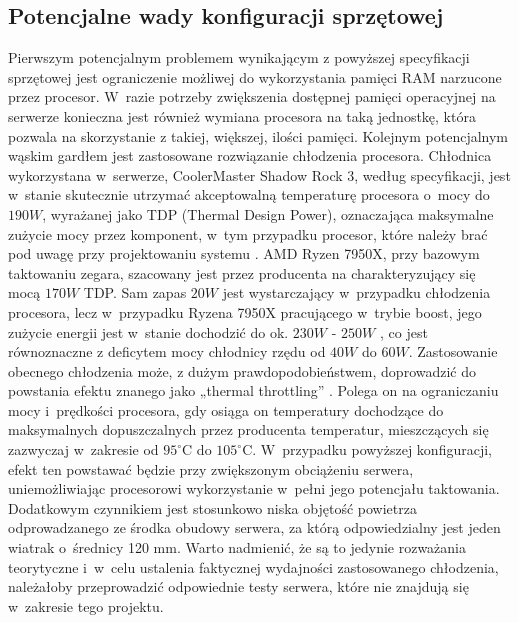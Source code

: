 \subsection{Potencjalne wady konfiguracji sprzętowej}
Pierwszym potencjalnym problemem wynikającym z powyższej specyfikacji sprzętowej jest ograniczenie możliwej do wykorzystania pamięci RAM narzucone przez procesor. W~razie potrzeby zwiększenia dostępnej pamięci operacyjnej na serwerze konieczna jest również wymiana procesora na taką jednostkę, która pozwala na skorzystanie z takiej, większej, ilości pamięci. Kolejnym potencjalnym wąskim gardłem jest zastosowane rozwiązanie chłodzenia procesora. Chłodnica wykorzystana w~serwerze, CoolerMaster Shadow Rock 3, według specyfikacji, jest w~stanie skutecznie utrzymać akceptowalną temperaturę procesora o~mocy do $190 W$, wyrażanej jako TDP (Thermal Design Power), oznaczająca maksymalne zużycie mocy przez komponent, w~tym przypadku procesor, które należy brać pod uwagę przy projektowaniu systemu \cite{intelTdp}. AMD Ryzen 7950X, przy bazowym taktowaniu zegara, szacowany jest przez producenta na charakteryzujący się mocą $170 W$ TDP. Sam zapas $20W$ jest wystarczający w~przypadku chłodzenia procesora, lecz w~przypadku Ryzena 7950X pracującego w~trybie boost, jego zużycie energii jest w~stanie dochodzić do ok. $230 W$ - $250 W$ \cite{amdPpt, testyMocy}, co jest równoznaczne z deficytem mocy chłodnicy rzędu od $40W$ do $60W$. Zastosowanie obecnego chłodzenia może, z dużym prawdopodobieństwem, doprowadzić do powstania efektu znanego jako „thermal throttling” \cite{throttling}. Polega on na ograniczaniu mocy i~prędkości procesora, gdy osiąga on temperatury dochodzące do maksymalnych dopuszczalnych przez producenta temperatur, mieszczących się zazwyczaj w~zakresie od $95^{\circ}\mathrm{C}$ do $105^{\circ}\mathrm{C}$. W~przypadku powyższej konfiguracji, efekt ten powstawać będzie przy zwiększonym obciążeniu serwera, uniemożliwiając procesorowi wykorzystanie w~pełni jego potencjału taktowania. Dodatkowym czynnikiem jest stosunkowo niska objętość powietrza odprowadzanego ze środka obudowy serwera, za którą odpowiedzialny jest jeden wiatrak o~średnicy 120 mm. Warto nadmienić, że są to jedynie rozważania teorytyczne i~w~celu ustalenia faktycznej wydajności zastosowanego chłodzenia, należałoby przeprowadzić odpowiednie testy serwera, które nie znajdują się w~zakresie tego projektu.

